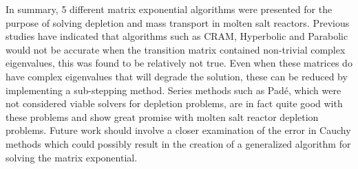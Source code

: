 In summary, 5 different matrix exponential algorithms were presented for the purpose of solving depletion and mass transport in molten salt reactors. Previous studies have indicated that algorithms such as CRAM, Hyperbolic and Parabolic would not be accurate when the transition matrix contained non-trivial complex eigenvalues, this was found to be relatively not true. Even when these matrices do have complex eigenvalues that will degrade the solution, these can be reduced by implementing a sub-stepping method. Series methods such as Pad\'e, which were not considered viable solvers for depletion problems, are in fact quite good with these problems and show great promise with molten salt reactor depletion problems. Future work should involve a closer examination of the error in Cauchy methods which could possibly result in the creation of a generalized algorithm for solving the matrix exponential. 

